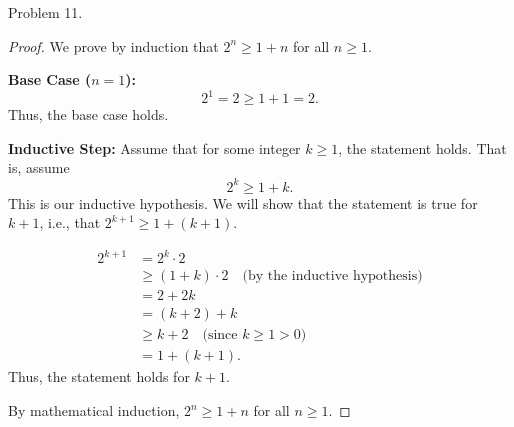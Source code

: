 \documentclass{article}
\begin{document}
Problem 11.
\begin{proof}
We prove by induction that $2^{n} \geq 1 + n$ for all $n \geq 1$.

\textbf{Base Case ($n = 1$):}
\[
2^{1} = 2 \geq 1 + 1 = 2.
\]
Thus, the base case holds.

\textbf{Inductive Step:} Assume that for some integer $k \geq 1$, the statement holds. That is, assume
\[
2^{k} \geq 1 + k.
\]
This is our inductive hypothesis. We will show that the statement is true for $k+1$, i.e., that $2^{k+1} \geq 1 + (k+1)$.

\begin{align*}
2^{k+1} &= 2^{k} \cdot 2 \\
&\geq (1 + k) \cdot 2 \quad \text{(by the inductive hypothesis)} \\
&= 2 + 2k \\
&= (k + 2) + k \\
&\geq k + 2 \quad \text{(since $k \geq 1 > 0$)} \\
&= 1 + (k + 1).
\end{align*}
Thus, the statement holds for $k+1$.

By mathematical induction, $2^{n} \geq 1 + n$ for all $n \geq 1$.
\end{proof}
\end{document}
